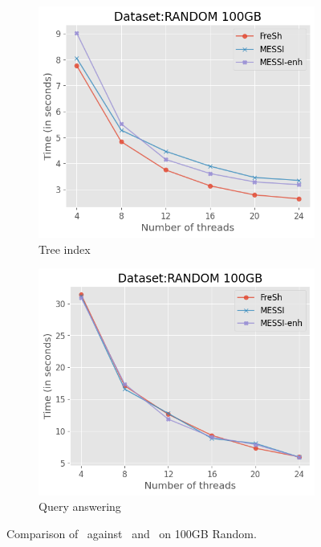 \begin{figure}[htbp]
    \vspace{0.2cm} %

    \begin{subfigure}{0.45\textwidth}
        \includegraphics[width=\textwidth]{figures/Experiments/fresh-messi-threads-random-tree}
        \caption{Tree index}
        \label{fig:eval:fresh-messi-threads:random:tree-from-4}
    \end{subfigure}    
    \begin{subfigure}{0.45\textwidth}
        \includegraphics[width=\textwidth]{figures/Experiments/fresh-messi-threads-random-query}
        \caption{Query answering}
        \label{fig:eval:fresh-messi-threads:random:queries-from-4}
    \end{subfigure}                

    \caption{Comparison of \Fresh\ against \MESSI\ and \MESSIenh\ on 100GB Random.}
    \label{fig:eval:fresh-messi-threads:random}
\end{figure}

